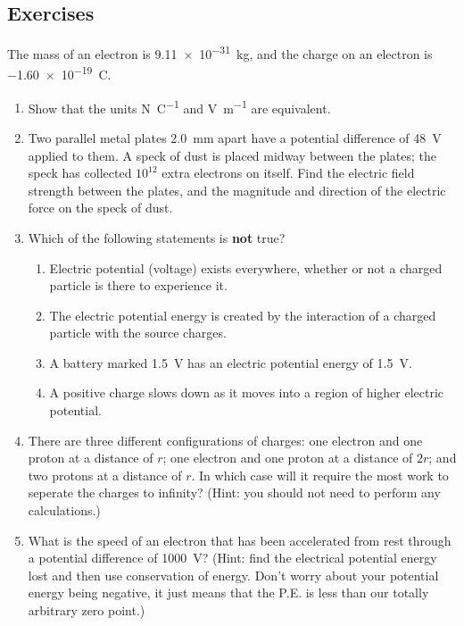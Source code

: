 \documentclass[a4paper]{amsbook}
\begin{document}
\subsection{Exercises}
The mass of an electron is \SI{9.11e-31}{\kilo\gram}, and the charge on an electron is \SI{-1.60e-19}{\coulomb}.
\begin{enumerate}
  \item Show that the units \si{\newton\per\coulomb} and \si{\volt\per\metre} are equivalent.
  \item Two parallel metal plates \SI{2.0}{\milli\metre} apart have a potential difference of \SI{48}{\volt} applied
        to them. A speck of dust is placed midway between the plates; the speck has collected $ 10^{12} $ extra electrons
        on itself. Find the electric field strength between the plates, and the magnitude and direction of the electric
        force on the speck of dust.
  \item Which of the following statements is \textbf{not} true?
    \begin{enumerate}
      \item Electric potential (voltage) exists everywhere, whether or not a charged particle is there to experience it.
      \item The electric potential energy is created by the interaction of a charged particle with the source charges.
      \item A battery marked \SI{1.5}{\volt} has an electric potential energy of \SI{1.5}{\volt}.
      \item A positive charge slows down as it moves into a region of higher electric potential.
    \end{enumerate}
  \item There are three different configurations of charges: one electron and one proton at a distance of $ r $;
        one electron and one proton at a distance of $ 2r $; and two protons at a distance of $ r $. In which case
        will it require the most work to seperate the charges to infinity? (Hint: you should not need to perform
        any calculations.)
  \item What is the speed of an electron that has been accelerated from rest through a potential difference of \SI{1000}{\volt}?
        (Hint: find the electrical potential energy lost and then use conservation of energy. Don't worry about your potential energy
        being negative, it just means that the P.E. is less than our totally arbitrary zero point.)
\end{enumerate}
\end{document}
